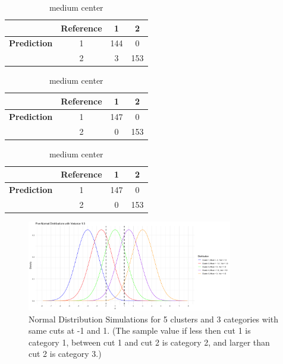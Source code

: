 \documentclass{article}
\begin{document}
\begin{table}[htbp!]
  \centering

  \caption*{\textbf{Confusion matrix of Normal Distributions}}

  \begin{minipage}{0.45\textwidth}
    \centering
    \begin{tabular}{c|c|c|c}
              & \textbf{Reference} & 1 & 2 \\
    \hline
    \textbf{Prediction} & 1 & 144 & 0 \\
                        & 2 & 3 & 153 \\
    \end{tabular}
    \caption{Close center}
    \label{tab:nor_close}
  \end{minipage}
  \hfill
  \begin{minipage}{0.45\textwidth}
    \centering
    \begin{tabular}{c|c|c|c}
              & \textbf{Reference} & 1 & 2 \\
    \hline
    \textbf{Prediction} & 1 & 147 & 0 \\
                        & 2 & 0 & 153 \\
    \end{tabular}
    \caption{Far center}
    \label{tab:nor_far}
  \end{minipage}

  \vspace{1em} %

  \begin{minipage}{0.45\textwidth}
    \centering
    \begin{tabular}{c|c|c|c}
              & \textbf{Reference} & 1 & 2 \\
    \hline
    \textbf{Prediction} & 1 & 147 & 0 \\
                        & 2 & 0 & 153 \\
    \end{tabular}
    \caption{medium center}
    \label{tab:nor_cuts}
  \end{minipage}
\end{table}

\begin{figure}[htbp!]
  \centering
  \includegraphics[width=0.8\textwidth]{images/dist_simu/dist_5_clusters.png}
  \caption{Normal Distribution Simulations for 5 clusters and 3 categories with same cuts at -1 and 1.
   (The sample value if less then cut 1 is category 1, between cut 1 and cut 2 is category 2, and larger than cut 2 is category 3.)
  }
  \label{fig:dist_5_clus}
\end{figure}
\end{document}
